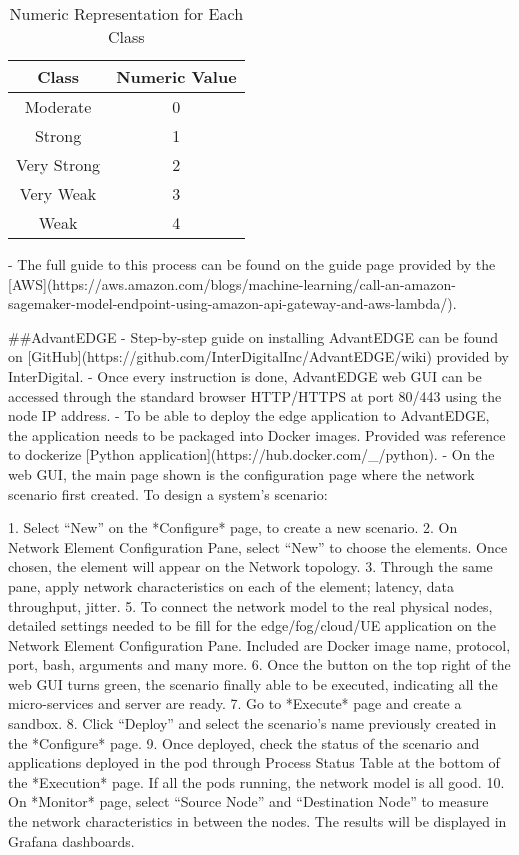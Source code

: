 \begin{table}[ht]
\centering
\begin{center}
\begin{tabular}{ |c|c| } 
  \hline
 Class  & Numeric Value\\ 
  \hline\hline
Moderate & 0\\ 
Strong & 1\\ 
Very Strong & 2\\ 
Very Weak & 3\\ 
Weak & 4\\ 

 \hline
\end{tabular}
\caption{Numeric Representation for Each Class}
\label{table:class}
\end{center}
\end{table}
\begin{markdown}
- The full guide to this process can be found on the guide page provided by the
[AWS](https://aws.amazon.com/blogs/machine-learning/call-an-amazon-sagemaker-model-endpoint-using-amazon-api-gateway-and-aws-lambda/).


##AdvantEDGE
- Step-by-step guide on installing AdvantEDGE can be found on [GitHub](https://github.com/InterDigitalInc/AdvantEDGE/wiki) provided by InterDigital. 
- Once every instruction is done, AdvantEDGE web GUI can be accessed through the standard browser HTTP/HTTPS at port 80/443 using the node IP address. 
- To be able to deploy the edge application to AdvantEDGE, the application needs to be packaged into Docker images. Provided was reference to dockerize [Python application](https://hub.docker.com/_/python). 
- On the web GUI, the main page shown is the configuration page where the network scenario first created. To design a system’s scenario:

    1. Select “New” on the *Configure* page, to create a new scenario.
    2. On Network Element Configuration Pane, select “New” to choose the elements. Once chosen, the element will appear on the Network topology.
    3. Through the same pane, apply network characteristics on each of the element; latency, data throughput, jitter. 
    5. To connect the network model to the real physical nodes, detailed settings needed to be fill for the edge/fog/cloud/UE application on the Network Element Configuration Pane. Included are Docker image name, protocol, port, bash, arguments and many more. 
    6. Once the button on the top right of the web GUI turns green, the scenario finally able to be executed, indicating all the micro-services and server are ready.
    7. Go to *Execute* page and create a sandbox.
    8. Click “Deploy” and select the scenario’s name previously created in the *Configure* page.
    9. Once deployed, check the status of the scenario and applications deployed in the pod through Process Status Table at the bottom of the *Execution* page. If all the pods running, the network model is all good.
    10.	On *Monitor* page, select “Source Node” and “Destination Node” to measure the network characteristics in between the nodes. The results will be displayed in Grafana dashboards.

\end{markdown}

